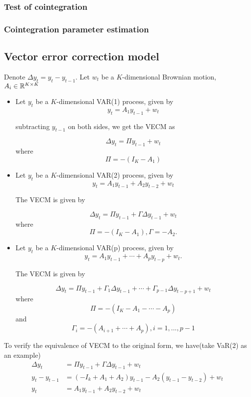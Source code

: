 \subsubsection{Test of cointegration}



\subsubsection{Cointegration parameter estimation}





\subsection{Vector error correction model}


\begin{definition}\cite[248]{lutkepohl2005new}
Denote $\Delta y_t = y_t - y_{t-1}$. Let $w_t$ be a $K$-dimensional Brownian motion, $A_i\in \mathbb{R}^{K\times K}$	
\begin{itemize}
	\item Let $y_t$ be a $K$-dimensional VAR(1) process, given by
	$$y_t = A_1y_{t-1} + w_t$$
	
	subtracting $y_{t-1}$ on both sides, we get the VECM as
	
	$$\Delta y_t = \Pi y_{t-1} + w_t$$
	where
	$$\Pi = - (I_K - A_1)$$
	\item Let $y_t$ be a $K$-dimensional VAR(2) process, given by
	$$y_t = A_1y_{t-1} + A_2y_{t-2} + w_t$$
	
	The VECM is given by
	
	$$\Delta y_t = \Pi y_{t-1} + \Gamma\Delta y_{t-1} + w_t$$
	where
	$$\Pi = - (I_K - A_1), \Gamma = -A_{2}.$$
	\item 	Let $y_t$ be a $K$-dimensional VAR(p) process, given by
	$$y_t = A_1y_{t-1} + \cdots + A_py_{t-p} + w_t.$$
	
	The VECM is given by
	
	$$\Delta y_t = \Pi y_{t-1} + \Gamma_1\Delta y_{t-1} + \cdots + \Gamma_{p-1}\Delta y_{t-p+1} + w_t$$
	where
	$$\Pi = - (I_K - A_1 - \cdots - A_p)$$
	and
	$$\Gamma_i = -(A_{i+1}+\cdots + A_p), i=1,...,p-1$$
\end{itemize}	 
\end{definition}

\begin{remark}
To verify the equivalence of VECM to the original form, we have(take VaR(2) as an example)
\begin{align*}
\Delta y_t &= \Pi y_{t-1} + \Gamma\Delta y_{t-1} + w_t \\
y_t - y_{t-1} &= (-I_k+A_1+A_2)y_{t-1} - A_2(y_{t-1}-y_{t-2})+w_t \\
y_t &= A_1y_{t-1} + A_2y_{t-2} + w_t
\end{align*}	
\end{remark}



